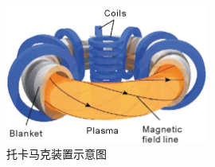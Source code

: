 \begin{figure}[htbp] %
	\centering
	\includegraphics[width=0.6\textwidth]{image/chap03/tokamak.png}
	\caption{托卡马克装置示意图\cite{xu2016general}}
	\label{fig:tokamak}
\end{figure}